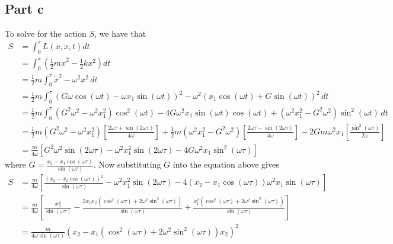 \documentclass[12pt]{report}
\begin{document}
\subsection*{Part c}
To solve for the action $S$, we have that
\begin{align*}
  S &= \int_0^\tau L(x, \dot{x}, t) dt \\
    &= \int_0^\tau \left(\frac{1}{2}m\dot{x}^2 - \frac{1}{2}kx^2\right) dt \\
    &= \frac{1}{2}m\int_0^\tau \dot{x}^2 - \omega^2 x^2 \, dt \\ 
    &= \frac{1}{2}m\int_0^\tau (G\omega \cos(\omega t) - \omega x_1 \sin(\omega t))^2 - \omega^2 (x_1 \cos(\omega t) + G\sin(\omega t))^2 \, dt \\
    &= \frac{1}{2}m \int_0^\tau (G^2\omega^2 - \omega^2x_1^2) \cos^2(\omega t) - 4G\omega^2x_1 \sin(\omega t) \cos(\omega t) + (\omega^2x_1^2 - G^2\omega^2) \sin^2(\omega t) \, dt \\
    &= \frac{1}{2}m(G^2\omega^2 - \omega^2 x_1^2) \left[\frac{2\omega \tau + \sin(2\omega \tau)}{4\omega}\right] + \frac{1}{2}m(\omega^2x_1^2 - G^2\omega^2) \left[\frac{2\omega \tau - \sin(2\omega \tau)}{4\omega}\right] - 2Gm\omega^2x_1 \left[\frac{\sin^2(\omega \tau)}{2\omega}\right] \\ 
    &= \frac{m}{4\omega} \left[G^2\omega^2 \sin(2\omega \tau) - \omega^2 x_1^2 \sin(2\omega \tau) - 4G\omega^2x_1 \sin^2(\omega \tau)\right]
\end{align*}
where $G = \frac{x_2 - x_1 \cos\left(\omega \tau\right)}{\sin\left(\omega \tau\right)}$. Now substituting $G$ into the equation above gives
\begin{align*}
  S &= \frac{m}{4\omega} \left[\frac{(x_2 - x_1 \cos(\omega \tau))^2}{\sin(\omega \tau)} - \omega^2 x_1^2 \sin(2\omega \tau) - 4(x_2 - x_1 \cos(\omega \tau))\omega^2x_1 \sin(\omega \tau)\right] \\
    &= \frac{m}{4\omega} \left[\frac{x_2^2}{\sin(\omega \tau)} - \frac{2x_1x_2 (\cos^2(\omega\tau) + 2 \omega^2 \sin^2(\omega \tau))}{\sin(\omega \tau)} + \frac{x_1^2 (\cos^2(\omega \tau) + 2\omega^2 \sin^2(\omega \tau))}{\sin(\omega \tau)}\right] \\
    &= \frac{m}{4\omega \sin(\omega \tau)} (x_2 - x_1(\cos^2(\omega \tau) + 2\omega^2 \sin^2(\omega \tau))x_2)^2
\end{align*}
\end{document}

